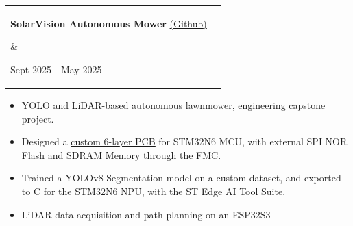 \documentclass{article}
\begin{document}
    \raggedright\begin{tabular}{lr}
        \parbox[l]{3.65in}{{\bf{\large{SolarVision Autonomous Mower}}} \href{https://github.com/SolarVisionMower/SolarVision}{(\underline{Github})}} &
        \parbox[r]{3.65in}{\raggedleft Sept 2025 - May 2025} \\
    \end{tabular}
    \begin{itemize} \vspace{-5pt}
        \setlength{\itemsep}{-2pt}
        \item YOLO and LiDAR-based autonomous lawnmower, engineering capstone project.
        \item Designed a \href{https://github.com/SolarVisionMower/SolarVision/blob/dev/PCBDesign/Hardware/STM32N6_Board/schematic.pdf}{\underline{custom 6-layer PCB}} for STM32N6 MCU, with external SPI NOR Flash and SDRAM Memory through the FMC.
        \item Trained a YOLOv8 Segmentation model on a custom dataset, and exported to C for the STM32N6 NPU, with the ST Edge AI Tool Suite.
        \item LiDAR data acquisition and path planning on an ESP32S3
    \end{itemize}

\end{document}
